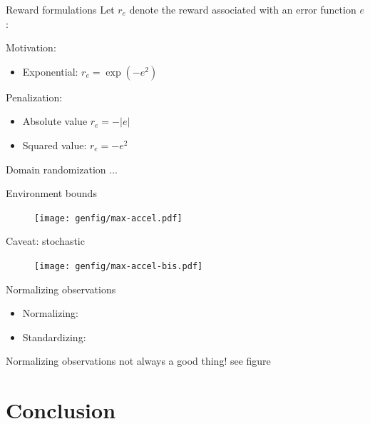 \documentclass[11pt, aspectratio=169]{beamer}
\begin{document}
\begin{frame}{Reward formulations}
    Let $r_e$ denote the reward associated with an error function $e$:

    Motivation:
    \begin{itemize}
        \item Exponential: $r_e = \exp(-e^2)$
    \end{itemize}

    Penalization:
    \begin{itemize}
        \item Absolute value $r_e = -|e|$
        \item Squared value: $r_e = -e^2$
    \end{itemize}
\end{frame}

\begin{frame}{Domain randomization}
    ...
\end{frame}

\begin{frame}{Environment bounds}
    \begin{figure}
        \texttt{[image: genfig/max-accel.pdf]}
    \end{figure}
\end{frame}

\begin{frame}{Caveat: stochastic}
    \begin{figure}
        \texttt{[image: genfig/max-accel-bis.pdf]}
    \end{figure}
\end{frame}

\begin{frame}{Normalizing observations}
    \begin{itemize}
        \item Normalizing:
        \item Standardizing:
    \end{itemize}
\end{frame}

\begin{frame}{Normalizing observations}
    not always a good thing! see figure
\end{frame}

\section{Conclusion}
\end{document}
